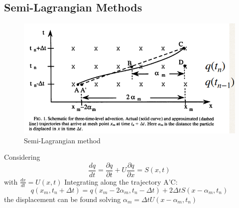 \subsection{Semi-Lagrangian Methods}
\begin{figure}[h!]
    \centering
    \includegraphics[width=0.5\linewidth]{uploads/Screenshot 2024-11-19 142400.png}
    \caption{Semi-Lagrangian method}
    \label{fig:enter-label}
\end{figure}
Considering
$$\frac{dq}{dt}=\frac{\partial q}{\partial t}+U\frac{\partial q}{\partial x}=S(x,t)$$
with $\frac{dx}{dt}=U(x,t)$
Integrating along the trajectory A'C:
$$q(x_m,t_n+\Delta t)=q(x_m-2\alpha_m,t_n-\Delta t)+2\Delta tS(x-\alpha_m,t_n)$$
the displacement can be found solving $\alpha_m=\Delta tU(x-\alpha_m,t_n)$